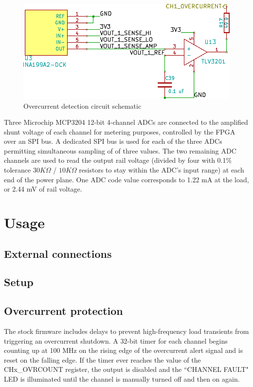 \documentclass{article}
\begin{document}
\begin{figure}[h!]
\includegraphics[scale=0.25]{output-stage-2.png}
\caption{Overcurrent detection circuit schematic}
\label{output-stage-2}
\end{figure}

Three Microchip MCP3204 12-bit 4-channel ADCs are connected to the amplified shunt voltage of each channel for metering
purposes, controlled by the FPGA over an SPI bus. A dedicated SPI bus is used for each of the three ADCs permitting
simultaneous sampling of of three values. The two remaining ADC channels are used to read the output rail voltage
(divided by four with 0.1\% tolerance $30K\Omega$ / $10K\Omega$ resistors to stay within the ADC's input range) at each
end of the power plane. One ADC code value corresponds to 1.22 mA at the load, or 2.44 mV of rail voltage.

\pagebreak
\section{Usage}

\subsection{External connections}

\subsection{Setup}

\subsection{Overcurrent protection}

The stock firmware includes delays to prevent high-frequency load transients from triggering an overcurrent 
shutdown. A 32-bit timer for each channel begins counting up at 100 MHz on the rising edge of the overcurrent alert 
signal and is reset on the falling edge. If the timer ever reaches the value of the CHx\_OVRCOUNT register, the 
output is disabled and the ``CHANNEL FAULT" LED is illuminated until the channel is manually turned off and then on 
again.
\end{document}
